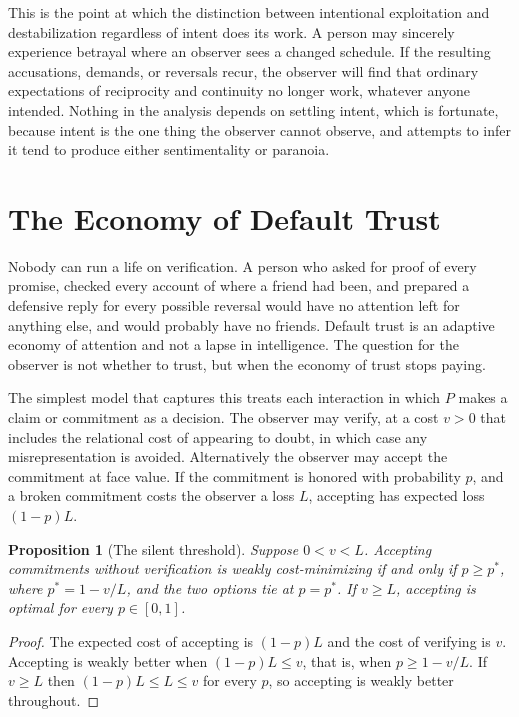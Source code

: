\documentclass[11pt]{article}
\newtheorem{proposition}{Proposition}
\theoremstyle{definition}
\theoremstyle{remark}
\begin{document}
This is the point at which the distinction between intentional exploitation and destabilization regardless of intent does its work. A person may sincerely experience betrayal where an observer sees a changed schedule. If the resulting accusations, demands, or reversals recur, the observer will find that ordinary expectations of reciprocity and continuity no longer work, whatever anyone intended. Nothing in the analysis depends on settling intent, which is fortunate, because intent is the one thing the observer cannot observe, and attempts to infer it tend to produce either sentimentality or paranoia.

\section{The Economy of Default Trust}\label{sec:trust}

Nobody can run a life on verification. A person who asked for proof of every promise, checked every account of where a friend had been, and prepared a defensive reply for every possible reversal would have no attention left for anything else, and would probably have no friends. Default trust is an adaptive economy of attention and not a lapse in intelligence. The question for the observer is not whether to trust, but when the economy of trust stops paying.

The simplest model that captures this treats each interaction in which $P$ makes a claim or commitment as a decision. The observer may verify, at a cost $v>0$ that includes the relational cost of appearing to doubt, in which case any misrepresentation is avoided. Alternatively the observer may accept the commitment at face value. If the commitment is honored with probability $p$, and a broken commitment costs the observer a loss $L$, accepting has expected loss $(1-p)L$.

\begin{proposition}[The silent threshold]\label{prop:threshold}
Suppose $0<v<L$. Accepting commitments without verification is weakly cost-minimizing if and only if $p\ge p^{*}$, where $p^{*}=1-v/L$, and the two options tie at $p=p^{*}$. If $v\ge L$, accepting is optimal for every $p\in[0,1]$.
\end{proposition}

\begin{proof}
The expected cost of accepting is $(1-p)L$ and the cost of verifying is $v$. Accepting is weakly better when $(1-p)L\le v$, that is, when $p\ge 1-v/L$. If $v\ge L$ then $(1-p)L\le L\le v$ for every $p$, so accepting is weakly better throughout.
\end{proof}
\end{document}
